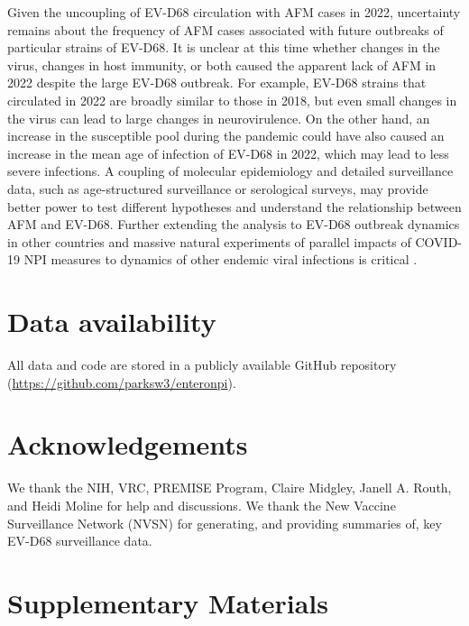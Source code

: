 \documentclass[12pt]{article}
\begin{document}
Given the uncoupling of EV-D68 circulation with AFM cases in 2022, uncertainty remains about the frequency of AFM cases associated with future outbreaks of particular strains of EV-D68.
It is unclear at this time whether changes in the virus, changes in host immunity, or both caused the apparent lack of AFM in 2022 despite the large EV-D68 outbreak.
For example, EV-D68 strains that circulated in 2022 are broadly similar to those in 2018, but even small changes in the virus can lead to large changes in neurovirulence.
On the other hand, an increase in the susceptible pool during the pandemic could have also caused an increase in the mean age of infection of EV-D68 in 2022, which may lead to less severe infections.
A coupling of molecular epidemiology and detailed surveillance data, such as age-structured surveillance or serological surveys, may provide better power to test different hypotheses and understand the relationship between AFM and EV-D68.
Further extending the analysis to EV-D68 outbreak dynamics in other countries and massive natural experiments of parallel impacts of COVID-19 NPI measures to dynamics of other endemic viral infections is critical \citep{baker2020impact}.

\section*{Data availability}

All data and code are stored in a publicly available GitHub repository (\url{https://github.com/parksw3/enteronpi}).


\section*{Acknowledgements}

We thank the NIH, VRC, PREMISE Program, Claire Midgley, Janell A. Routh, and Heidi Moline for help and discussions.
We thank the New Vaccine Surveillance Network (NVSN) for generating, and providing summaries of, key EV-D68 surveillance data.

\pagebreak

\section*{Supplementary Materials}
\setcounter{figure}{0}
\renewcommand{\thefigure}{S\arabic{figure}}
\end{document}
